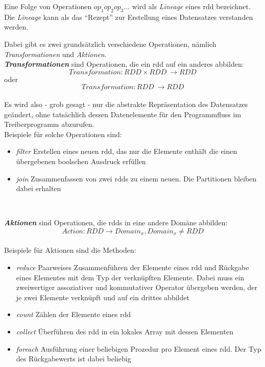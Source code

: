 Eine Folge von Operationen $op_1op_2op_3...$ wird als \textit{Lineage} eines \gls{rdd} bezeichnet. Die \textit{Lineage} kann als das "`Rezept"' zur Erstellung eines Datensatzes verstanden werden.

Dabei gibt es zwei grundsätzlich verschiedene Operationen, nämlich \textit{Transformationen} und \textit{Aktionen}.\\

\textbf{\textit{Transformationen}} sind Operationen, die ein \gls{rdd} auf ein anderes abbilden:\\
\[Transformation: RDD \times RDD\ \longrightarrow RDD\]
oder
\[Transformation: RDD\ \longrightarrow RDD\]
\\
Es wird also - grob gesagt - nur die abstrakte Repräsentation des Datensatzes geändert, ohne tatsächlich dessen Datenelemente für den Programmfluss im Treiberprogramm abzurufen.\\
Beispiele für solche Operationen sind:
\begin{itemize}
	\item \textit{filter} \newline Erstellen eines neuen \gls{rdd}, das nur die Elemente enthält die einen übergebenen boolschen Ausdruck erfüllen
	\item \textit{join} \newline Zusammenfassen von zwei \glspl{rdd} zu einem neuen. Die Partitionen bleiben dabei erhalten
\end{itemize}\\
\newline

\textbf{\textit{Aktionen}} sind Operationen, die \glspl{rdd} in eine andere Domäne abbilden:\\
\[Action: RDD \longrightarrow Domain_x, Domain_x \neq RDD\]
\\
Beispiele für Aktionen sind die Methoden:
\begin{itemize}
	\item \textit{reduce} \newline Paarweises Zusammenführen der Elemente eines \gls{rdd} und Rückgabe eines Elementes mit dem Typ der verknüpften Elemente. Dabei muss ein zweiwertiger assoziativer und kommutativer Operator übergeben werden, der je zwei Elemente verknüpft und auf ein drittes abbildet
	\item \textit{count} \newline Zählen der Elemente eines \gls{rdd}
	\item \textit{collect} \newline Überführen des \gls{rdd} in ein lokales Array mit dessen Elementen
	\item \textit{foreach} \newline Ausführung einer beliebigen Prozedur pro Element eines \gls{rdd}. Der Typ des Rückgabewerts ist dabei beliebig
\end{itemize}\\


